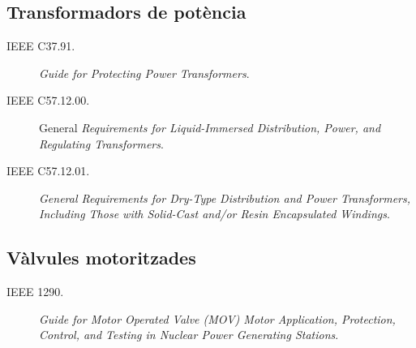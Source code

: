 \subsection*{Transformadors de potència}
\begin{description}
    \item [\hspace{5mm}IEEE C37.91.] \textit{Guide for Protecting Power Transformers}.
    \item [\hspace{5mm}IEEE C57.12.00.] General \textit{Requirements for Liquid-Immersed Distribution, Power, and Regulating Transformers}.
    \item [\hspace{5mm}IEEE C57.12.01.] \textit{General Requirements for Dry-Type Distribution and Power Transformers, Including Those with Solid-Cast and/or Resin Encapsulated Windings}.
\end{description}



\subsection*{Vàlvules motoritzades}
\begin{description}
    \item [\hspace{5mm}IEEE 1290.] \textit{Guide for Motor Operated Valve (MOV) Motor Application, Protection, Control, and Testing in Nuclear Power Generating Stations}.
\end{description}

